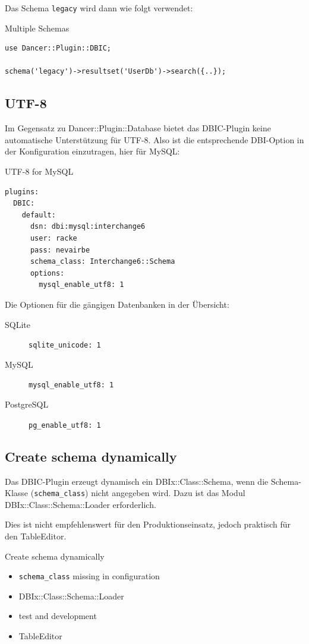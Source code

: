 Das Schema \verb|legacy| wird dann wie folgt verwendet:

\begin{frame}[fragile]{Multiple Schemas}
\begin{lstlisting}
use Dancer::Plugin::DBIC;

schema('legacy')->resultset('UserDb')->search({..});
\end{lstlisting}
\end{frame}

\subsection{UTF-8}
Im Gegensatz zu Dancer::Plugin::Database bietet das DBIC-Plugin
keine automatische Unterstützung für UTF-8. Also ist die entsprechende
DBI-Option in der Konfiguration einzutragen, hier für MySQL:
\begin{frame}[fragile]{UTF-8 for MySQL}
\begin{lstlisting}
plugins:
  DBIC:
    default:
      dsn: dbi:mysql:interchange6
      user: racke
      pass: nevairbe
      schema_class: Interchange6::Schema
      options:
        mysql_enable_utf8: 1
\end{lstlisting}
\end{frame}

Die Optionen für die gängigen Datenbanken in der Übersicht:

\begin{description}
\item[SQLite] \verb|sqlite_unicode: 1|
\item[MySQL] \verb|mysql_enable_utf8: 1|
\item[PostgreSQL] \verb|pg_enable_utf8: 1| 
\end{description}

\subsection{Create schema dynamically}
Das DBIC-Plugin erzeugt dynamisch ein DBIx::Class::Schema, wenn
die Schema-Klasse (\verb|schema_class|) nicht angegeben wird.
Dazu ist das Modul DBIx::Class::Schema::Loader erforderlich.

Dies ist nicht empfehlenswert für den Produktionseinsatz, jedoch
praktisch für den TableEditor.

\begin{frame}[fragile]{Create schema dynamically}
\begin{itemize}
\item \verb|schema_class| missing in configuration
\item DBIx::Class::Schema::Loader
\item test and development
\item TableEditor
\end{itemize}
\end{frame}

